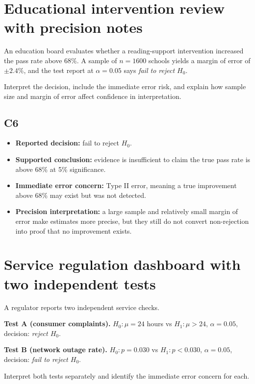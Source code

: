 \begin{ExamProblems}
\item
\section{Educational intervention review with precision notes}
An education board evaluates whether a reading-support intervention increased the pass rate above 68\%. A sample of \(n=1600\) schools yields a margin of error of \(\pm 2.4\%\), and the test report at \(\alpha=0.05\) says \textit{fail to reject \(H_0\)}.

Interpret the decision, include the immediate error risk, and explain how sample size and margin of error affect confidence in interpretation.

\subsection*{C6}
\begin{itemize}
    \item \textbf{Reported decision:} fail to reject \(H_0\).
    \item \textbf{Supported conclusion:} evidence is insufficient to claim the true pass rate is above 68\% at 5\% significance.
    \item \textbf{Immediate error concern:} Type II error, meaning a true improvement above 68\% may exist but was not detected.
    \item \textbf{Precision interpretation:} a large sample and relatively small margin of error make estimates more precise, but they still do not convert non-rejection into proof that no improvement exists.
\end{itemize}

\item
\section{Service regulation dashboard with two independent tests}
A regulator reports two independent service checks.

\textbf{Test A (consumer complaints).} \(H_0\colon \mu=24\) hours vs \(H_1\colon \mu>24\), \(\alpha=0.05\), decision: \textit{reject \(H_0\)}.

\textbf{Test B (network outage rate).} \(H_0\colon p=0.030\) vs \(H_1\colon p<0.030\), \(\alpha=0.05\), decision: \textit{fail to reject \(H_0\)}.

Interpret both tests separately and identify the immediate error concern for each.


\end{ExamProblems}
